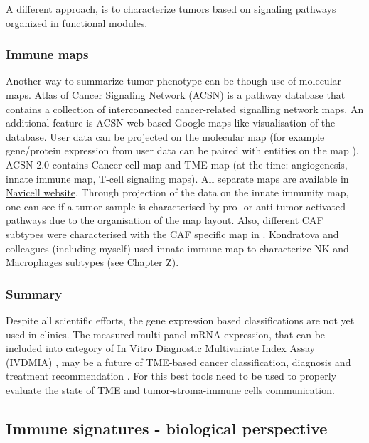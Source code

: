 \documentclass[12pt,]{book}
\theoremstyle{definition}
\theoremstyle{definition}
\theoremstyle{definition}
\theoremstyle{remark}
\begin{document}
A different approach, is to characterize tumors based on signaling
pathways organized in functional modules.

\hypertarget{immune-maps}{%
\subsubsection{Immune maps}\label{immune-maps}}

Another way to summarize tumor phenotype can be though use of molecular
maps. \href{https://acsn.curie.fr/}{Atlas of Cancer Signaling Network
(ACSN)} \citep{Kuperstein2013, Kuperstein2015} is a pathway database
that contains a collection of interconnected cancer-related signalling
network maps. An additional feature is ACSN web-based Google-maps-like
visualisation of the database. User data can be projected on the
molecular map (for example gene/protein expression from user data can be
paired with entities on the map ). ACSN 2.0 contains Cancer cell map and
TME map (at the time: angiogenesis, innate immune map, T-cell signaling
maps). All separate maps are available in
\href{https://navicell.curie.fr/pages/maps.html}{Navicell website}.
Through projection of the data on the innate immunity map, one can see
if a tumor sample is characterised by pro- or anti-tumor activated
pathways due to the organisation of the map layout. Also, different CAF
subtypes were characterised with the CAF specific map in
\citep{Costa2018}. Kondratova and colleagues (including myself) used
innate immune map to characterize NK and Macrophages subtypes
(\protect\hyperlink{map}{see Chapter Z}).

\hypertarget{summary-1}{%
\subsubsection{Summary}\label{summary-1}}

Despite all scientific efforts, the gene expression based
classifications are not yet used in clinics. The measured multi-panel
mRNA expression, that can be included into category of In Vitro
Diagnostic Multivariate Index Assay (IVDMIA)
\citep{Gyorffy2015, Ross2008}, may be a future of TME-based cancer
classification, diagnosis and treatment recommendation
\citep{Gnjatic2017}. For this best tools need to be used to properly
evaluate the state of TME and tumor-stroma-immune cells communication.

\hypertarget{immune-signatures}{%
\subsection{Immune signatures - biological
perspective}\label{immune-signatures}}
\end{document}
